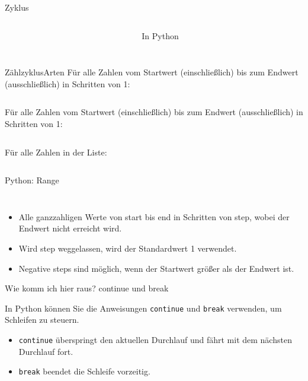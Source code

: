 \documentclass[xelatex,aspectratio=169]{beamer}
\begin{document}
\begin{frame}{Zyklus}
\begin{columns}[t]
\begin{column}{.3\linewidth}
    \end{column}
    \begin{column}{.4\linewidth}
      \begin{block}{In Python}
        \begin{minipage}[c][.7\textheight][c]{\textwidth}
          \inputminted{python}{src/algorithmus_zyklus.py}
        \end{minipage}
      \end{block}

    \end{column}
  \end{columns}

\end{frame}

\begin{frame}{Zählzyklus}{Arten}
  Für alle Zahlen vom Startwert (einschließlich) bis zum Endwert (ausschließlich) in Schritten von 1:
  \inputminted{python}{src/algorithmus_zaehlzyklus_range.py}

  Für alle Zahlen vom Startwert (einschließlich) bis zum Endwert (ausschließlich) in Schritten von 1:
  \inputminted{python}{src/algorithmus_zaehlzyklus_while.py}

  Für alle Zahlen in der Liste:
  \inputminted{python}{src/algorithmus_zaehlzyklus_list.py}
\end{frame}

\begin{frame}{Python: Range}
  \inputminted{python}{src/algorithmus_zaehlzyklus_range.py}

  \inputminted{python}{src/algorithmus_zaehlzyklus_range_step.py}

  \begin{itemize}
    \item Alle ganzzahligen Werte von start bis end in Schritten von step, wobei der Endwert nicht erreicht wird.
    \item Wird step weggelassen, wird der Standardwert 1 verwendet.
    \item Negative steps sind möglich, wenn der Startwert größer als der Endwert ist.
  \end{itemize}
\end{frame}

\begin{frame}{Wie komm ich hier raus? continue und break}

  In Python können Sie die Anweisungen \texttt{continue} und \texttt{break} verwenden, um Schleifen zu steuern.
  \begin{itemize}
    \item \texttt{continue} überspringt den aktuellen Durchlauf und fährt mit dem nächsten Durchlauf fort.
    \item \texttt{break} beendet die Schleife vorzeitig.
  \end{itemize}

  \inputminted{python}{src/algorithmus_break_continue.py}
\end{frame}
\end{document}
